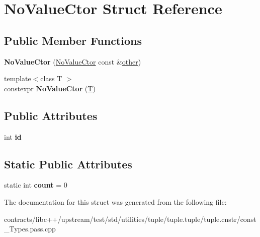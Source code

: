 \hypertarget{struct_no_value_ctor}{}\section{No\+Value\+Ctor Struct Reference}
\label{struct_no_value_ctor}
\subsection*{Public Member Functions}
\begin{DoxyCompactItemize}
\item 
\mbox{\label{struct_no_value_ctor_af111808c9639dba92c968b14a9a85322}} 
{\bfseries No\+Value\+Ctor} (\mbox{\hyperlink{struct_no_value_ctor}{No\+Value\+Ctor}} const \&\mbox{\hyperlink{structother}{other}})
\item 
\mbox{\label{struct_no_value_ctor_af19bd30fb20b6c18c75fd792e9b3779f}} 
{\footnotesize template$<$class T $>$ }\\constexpr {\bfseries No\+Value\+Ctor} (\mbox{\hyperlink{struct_t}{T}})
\end{DoxyCompactItemize}
\subsection*{Public Attributes}
\begin{DoxyCompactItemize}
\item 
\mbox{\label{struct_no_value_ctor_ad06b0e873bcc89e7a9de65c92d37c0a3}} 
int {\bfseries id}
\end{DoxyCompactItemize}
\subsection*{Static Public Attributes}
\begin{DoxyCompactItemize}
\item 
\mbox{\label{struct_no_value_ctor_a2ff8f59211ecd9f1d3cd69b397bd1c6d}} 
static int {\bfseries count} = 0
\end{DoxyCompactItemize}


The documentation for this struct was generated from the following file\+:\begin{DoxyCompactItemize}
\item 
contracts/libc++/upstream/test/std/utilities/tuple/tuple.\+tuple/tuple.\+cnstr/const\+\_\+\+Types.\+pass.\+cpp\end{DoxyCompactItemize}
